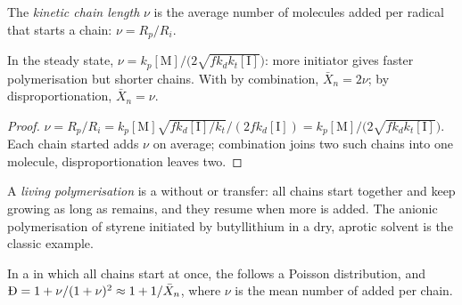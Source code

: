 \begin{definition}\label{def:b2:polymer-synthesis:chain-length}
The \emph{kinetic chain length} $\nu$ is the average number of 
molecules added per radical that starts a chain: $\nu = R_p/R_i$.
\end{definition}

\begin{proposition}\label{prop:b2:polymer-synthesis:chain-length}
In the steady state, $\nu = k_p[\mathrm M]/\bigl(2\sqrt{fk_dk_t[\mathrm I]}\bigr)$: more initiator gives
faster polymerisation but shorter chains. With  by combination, $\bar X_n = 2\nu$; by
disproportionation, $\bar X_n = \nu$.
\end{proposition}

\begin{proof}
$\nu = R_p/R_i = k_p[\mathrm M]\sqrt{fk_d[\mathrm I]/k_t}/(2fk_d[\mathrm I]) =
k_p[\mathrm M]/\bigl(2\sqrt{fk_dk_t[\mathrm I]}\bigr)$. Each chain started adds $\nu$  on average;
combination joins two such chains into one molecule, disproportionation leaves two.
\end{proof}

\begin{definition}\label{def:b2:polymer-synthesis:living}
A \emph{living polymerisation} is a  without
 or transfer: all chains start together and keep growing as long as  remains, and
they resume when more  is added. The anionic polymerisation of styrene initiated by
butyllithium in a dry, aprotic solvent is the classic example.
\end{definition}

\begin{proposition}\label{prop:b2:polymer-synthesis:living}
In a  in which all chains start at once, the  follows a
Poisson distribution, and $\text{\DH} = 1 + \nu/(1+\nu)^2 \approx 1 + 1/\bar X_n$, where $\nu$ is the
mean number of  added per chain.
\end{proposition}

